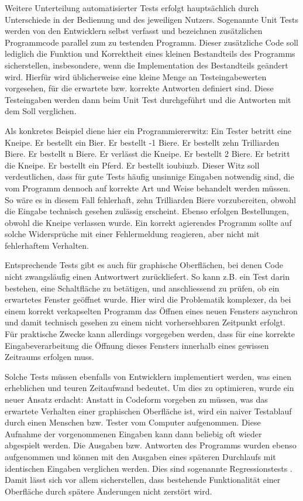 Weitere Unterteilung automatisierter Tests erfolgt hauptsächlich durch Unterschiede
in der Bedienung und des jeweiligen Nutzers. Sogenannte \glqq{}Unit Tests\grqq{} werden
von den Entwicklern selbst verfasst und bezeichnen zusätzlichen Programmcode parallel
zum zu testenden Programm. Dieser zusätzliche Code soll lediglich die Funktion und Korrektheit
eines kleinen Bestandteils des Programms sicherstellen, insbesondere, wenn die Implementation
des Bestandteils geändert wird. Hierfür wird üblicherweise eine kleine Menge an Testeingabewerten
vorgesehen, für die erwartete bzw. korrekte Antworten definiert sind. Diese Testeingaben
werden dann beim Unit Test durchgeführt und die Antworten mit dem Soll verglichen.

Als konkretes Beispiel diene hier ein Programmiererwitz: Ein Tester betritt eine Kneipe.
Er bestellt ein Bier. Er bestellt -1 Biere. Er bestellt zehn Trilliarden Biere. Er bestellt n Biere.
Er verlässt die Kneipe. Er bestellt 2 Biere. Er betritt die Kneipe. Er bestellt ein Pferd. Er bestellt \glqq{}ioubiuzb\grqq{}.
Dieser Witz soll verdeutlichen, dass für gute Tests häufig unsinnige Eingaben notwendig sind,
die vom Programm dennoch auf korrekte Art und Weise behandelt werden müssen. So wäre es in diesem
Fall fehlerhaft, zehn Trilliarden Biere vorzubereiten, obwohl die Eingabe technisch gesehen zulässig erscheint.
Ebenso erfolgen Bestellungen, obwohl die Kneipe verlassen wurde. Ein korrekt agierendes
Programm sollte auf solche Widersprüche mit einer Fehlermeldung reagieren, aber nicht mit
fehlerhaftem Verhalten.

Entsprechende Tests gibt es auch für graphische Oberflächen, bei denen Code nicht zwangsläufig
einen Antwortwert zurückliefert. So kann z.B. ein Test darin bestehen, eine Schaltfläche zu betätigen,
und anschliessend zu prüfen, ob ein erwartetes Fenster geöffnet wurde. Hier wird die Problematik
komplexer, da bei einem korrekt verkapselten Programm das Öffnen eines neuen Fensters asynchron
und damit technisch gesehen zu einem nicht vorhersehbaren Zeitpunkt erfolgt. Für praktische Zwecke
kann allerdings vorgegeben werden, dass für eine korrekte Eingabeverarbeitung die Öffnung dieses 
Fensters innerhalb eines gewissen Zeitraums erfolgen muss.

Solche Tests müssen ebenfalls von Entwicklern implementiert werden, was einen erheblichen und
teuren Zeitaufwand bedeutet. Um dies zu optimieren, wurde ein neuer Ansatz erdacht: Anstatt
in Codeform vorgeben zu müssen, was das erwartete Verhalten einer graphischen Oberfläche ist,
wird ein naiver Testablauf durch einen Menschen bzw. Tester vom Computer aufgenommen. Diese Aufnahme der
vorgenommenen Eingaben kann dann beliebig oft wieder abgespielt werden. Die Ausgaben bzw.
Antworten des Programms wurden ebenso aufgenommen und können mit den Ausgaben eines späteren
Durchlaufs mit identischen Eingaben verglichen werden. Dies sind sogenannte 
\glqq{}Regressionstests\grqq{} \cite{regression}. Damit lässt sich vor allem sicherstellen,
dass bestehende Funktionalität einer Oberfläche durch spätere Änderungen nicht zerstört wird.

